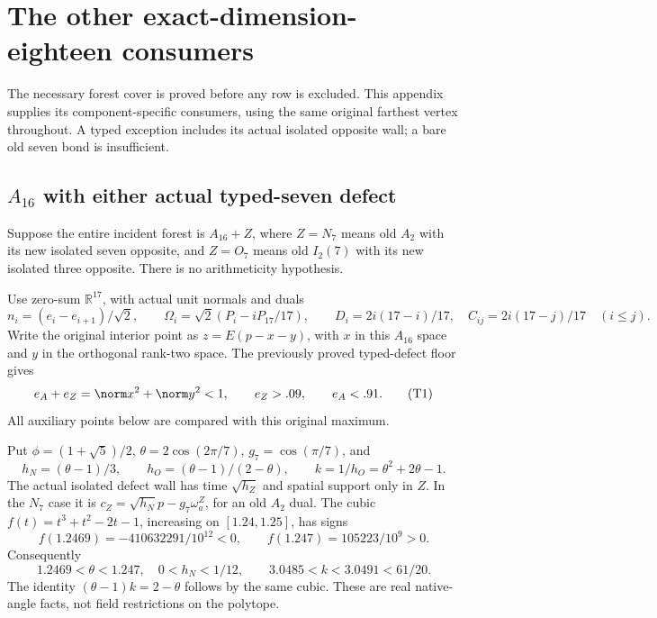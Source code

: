 \section{The other exact-dimension-eighteen consumers}
\label{app:otherexact18}
The necessary forest cover is proved before any row is excluded.
This appendix supplies its component-specific consumers, using the same
original farthest vertex throughout.  A typed exception includes its
actual isolated opposite wall; a bare old seven bond is insufficient.

\subsection{\(A_{16}\) with either actual typed-seven defect}
\label{app:A16typed18}
Suppose the entire incident forest is \(A_{16}+Z\), where
\(Z=N_7\) means old \(A_2\) with its new isolated seven opposite,
and \(Z=O_7\) means old \(I_2(7)\) with its new isolated three
opposite.  There is no arithmeticity hypothesis.

Use zero-sum \(\mathbb R^{17}\), with actual unit normals and duals
\[
 n_i=(e_i-e_{i+1})/\sqrt2,\qquad
 \Omega_i=\sqrt2(P_i-iP_{17}/17),\qquad
 D_i=2i(17-i)/17,\quad C_{ij}=2i(17-j)/17\quad(i\le j).
\]
Write the original interior point as \(z=E(p-x-y)\), with
\(x\) in this \(A_{16}\) space and \(y\) in the orthogonal
rank-two space.  The previously proved typed-defect floor gives
\[
 e_A+e_Z=\norm x^2+\norm y^2<1,\qquad e_Z>.09,
 \qquad e_A<.91.                                      \tag{T1}
\]
All auxiliary points below are compared with this original maximum.

Put \(\phi=(1+\sqrt5)/2\), \(\theta=2\cos(2\pi/7)\),
\(g_7=\cos(\pi/7)\), and
\[
 h_N=(\theta-1)/3,\qquad h_O=(\theta-1)/(2-\theta),
 \qquad k=1/h_O=\theta^2+2\theta-1.
\]
The actual isolated defect wall has time \(\sqrt{h_Z}\) and
spatial support only in \(Z\).  In the \(N_7\) case it is
\(c_Z=\sqrt{h_N}p-g_7\omega_a^Z\), for an old \(A_2\) dual.
The cubic \(f(t)=t^3+t^2-2t-1\), increasing on \([1.24,1.25]\),
has signs
\[
 f(1.2469)=-410632291/10^{12}<0,\qquad
 f(1.247)=105223/10^9>0.
\]
Consequently
\[
 1.2469<\theta<1.247,\quad 0<h_N<1/12,\qquad
 3.0485<k<3.0491<61/20.                              \tag{T2}
\]
The identity \((\theta-1)k=2-\theta\) follows by the same cubic.
These are real native-angle facts, not field restrictions on the polytope.


